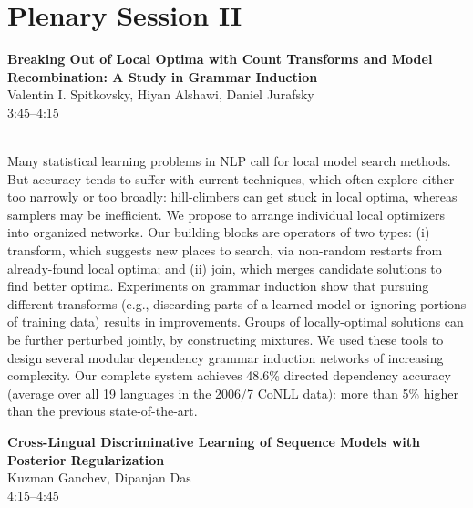 \documentclass[twoside,makeidx]{book}
\begin{document}
\section{Plenary Session II}
\vspace{-1em}
\par\vspace{2em}\noindent%
\begin{minipage}{\linewidth}%
\begin{center}
\textbf{\normalsize Breaking Out of Local Optima with Count Transforms and Model Recombination: A Study in Grammar Induction}\\
\normalsize  Valentin I. Spitkovsky,  Hiyan Alshawi,  Daniel Jurafsky\\
{\small 3:45--4:15}\\
\end{center}
\end{minipage}\\[0.5em]
\nopagebreak%
\noindent%
{\small Many statistical learning problems in NLP call for local model search methods. But accuracy tends to suffer with current techniques, which often explore either too narrowly or too broadly: hill-climbers can get stuck in local optima, whereas samplers may be inefficient.  We propose to arrange individual local optimizers into organized networks.  Our building blocks are operators of two types: (i) transform, which suggests new places to search, via non-random restarts from already-found local optima; and (ii) join, which merges candidate solutions to find better optima. Experiments on grammar induction show that pursuing different transforms (e.g., discarding parts of a learned model or ignoring portions of training data) results in improvements. Groups of locally-optimal solutions can be further perturbed jointly, by constructing mixtures. We used these tools to design several modular dependency grammar induction networks of increasing complexity. Our complete system achieves 48.6\% directed dependency accuracy (average over all 19 languages in the 2006/7 CoNLL data): more than 5\% higher than the previous state-of-the-art.}
\par\vspace{2em}\noindent%
\begin{minipage}{\linewidth}%
\begin{center}
\textbf{\normalsize Cross-Lingual Discriminative Learning of Sequence Models with Posterior Regularization}\\
\normalsize  Kuzman Ganchev,  Dipanjan Das\\
{\small 4:15--4:45}\\
\end{center}
\end{minipage}\\[0.5em]
\end{document}
